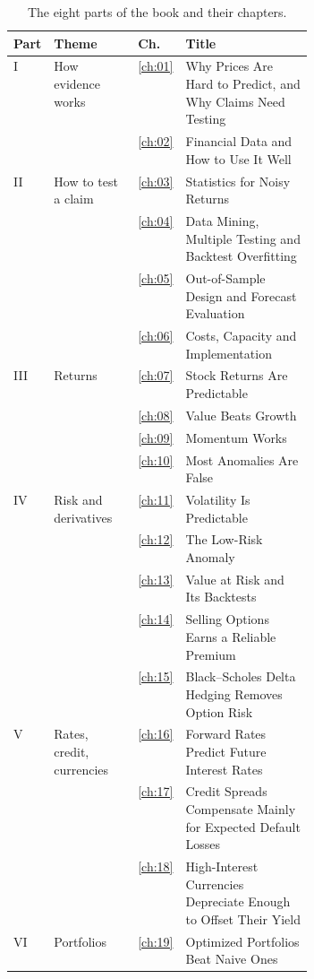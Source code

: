 \begin{table}[htbp]
\centering
\small
\caption{The eight parts of the book and their chapters.}
\label{tab:pref-parts}
\begin{tabularx}{0.95\linewidth}{@{}>{\raggedright\arraybackslash}p{0.07\linewidth}>{\raggedright\arraybackslash}p{0.28\linewidth}>{\raggedleft\arraybackslash}p{0.04\linewidth}>{\raggedright\arraybackslash}X@{}}
\toprule
Part & Theme & Ch. & Title \\
\midrule
I & How evidence works & \ref{ch:01} & Why Prices Are Hard to Predict, and Why Claims Need Testing \\
 &  & \ref{ch:02} & Financial Data and How to Use It Well \\
\addlinespace
II & How to test a claim & \ref{ch:03} & Statistics for Noisy Returns \\
 &  & \ref{ch:04} & Data Mining, Multiple Testing and Backtest Overfitting \\
 &  & \ref{ch:05} & Out-of-Sample Design and Forecast Evaluation \\
 &  & \ref{ch:06} & Costs, Capacity and Implementation \\
\addlinespace
III & Returns & \ref{ch:07} & Stock Returns Are Predictable \\
 &  & \ref{ch:08} & Value Beats Growth \\
 &  & \ref{ch:09} & Momentum Works \\
 &  & \ref{ch:10} & Most Anomalies Are False \\
\addlinespace
IV & Risk and derivatives & \ref{ch:11} & Volatility Is Predictable \\
 &  & \ref{ch:12} & The Low-Risk Anomaly \\
 &  & \ref{ch:13} & Value at Risk and Its Backtests \\
 &  & \ref{ch:14} & Selling Options Earns a Reliable Premium \\
 &  & \ref{ch:15} & Black--Scholes Delta Hedging Removes Option Risk \\
\addlinespace
V & Rates, credit, currencies & \ref{ch:16} & Forward Rates Predict Future Interest Rates \\
 &  & \ref{ch:17} & Credit Spreads Compensate Mainly for Expected Default Losses \\
 &  & \ref{ch:18} & High-Interest Currencies Depreciate Enough to Offset Their Yield \\
\addlinespace
VI & Portfolios & \ref{ch:19} & Optimized Portfolios Beat Naive Ones \\

\end{tabularx}
\end{table}
